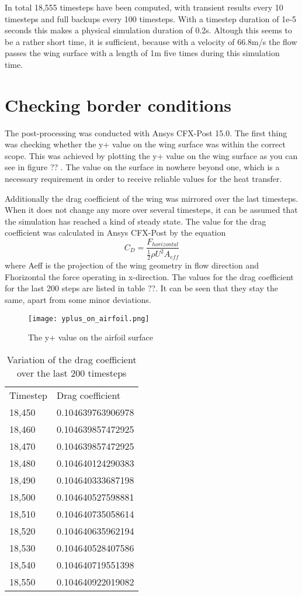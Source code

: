 In total 18,555 timesteps have been computed, with transient results every 10 timesteps and full backups every 100 timesteps. With a timestep duration of 1e-5 seconds this makes a physical simulation duration of 0.2s. Altough this seems to be a rather short time, it is sufficient, because with a velocity of 66.8m/s the flow passes the wing surface with a length of 1m five times during this simulation time.
\section{Checking border conditions}
The post-processing was conducted with Ansys CFX-Post 15.0. The first thing was checking whether the y+ value on the wing surface was within the correct scope. This was achieved by plotting the y+ value on the wing surface as you can see in figure ?? . The value on the surface in nowhere beyond one, which is a necessary requirement in order to receive reliable values for the heat transfer.

Additionally the drag coefficient of the wing was mirrored over the last timesteps. When it does not change any more over several timesteps, it can be assumed that the simulation has reached a kind of steady state. The value for the drag coefficient was calculated in Ansys CFX-Post by the equation
\begin{equation}
C_D = \frac{F_{horizontal}}{\frac{1}{2} \rho U^2 A_{eff}}
\end{equation}
where Aeff is the projection of the wing geometry in flow direction and Fhorizontal the force operating in x-direction.
The values for the drag coefficient for the last 200 steps are listed in table ??. It can be seen that they stay the same, apart from some minor deviations.
\begin{figure}[h]
\centering
\texttt{[image: yplus\_on\_airfoil.png]}
\caption{The y+ value on the airfoil surface}
\label{fig:yplus}
\end{figure}

\begin{table}[h]
\centering
\caption{Variation of the drag coefficient over the last 200 timesteps}
\label{fig:htc_values}
\begin{tabular}{ll}
Timestep&Drag coefficient\\
18,450&0.104639763906978\\
18,460&0.104639857472925\\
18,470&0.104639857472925\\
18,480&0.104640124290383\\
18,490&0.104640333687198\\
18,500&0.104640527598881\\
18,510&0.104640735058614\\
18,520&0.104640635962194\\
18,530&0.104640528407586\\
18,540&0.104640719551398\\
18,550&0.104640922019082\\
\end{tabular}
\end{table}
